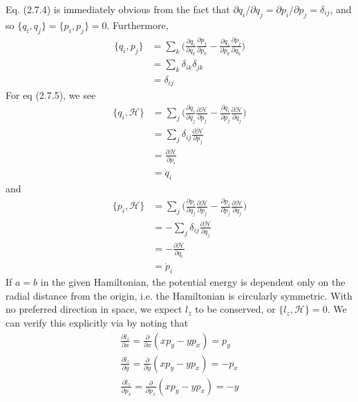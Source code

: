 \documentclass[../principles-of-quantum-mechanics.tex]{subfiles}
\begin{document}
\begin{questions}
		\begin{solution}
			Eq. (2.7.4) is immediately obvious from the fact that $\partial q_i/\partial q_j = \partial p_i/\partial p_j = \delta_{ij}$, and so $\{q_i, q_j\} = \{p_i, p_j\} = 0$. Furthermore,
			\begin{align*}
				\{q_i, p_j\} &= \sum_k\Big(\frac{\partial q_i}{\partial q_k}\frac{\partial p_j}{\partial p_k} - \frac{\partial q_i}{\partial p_k}\frac{\partial p_j}{\partial q_k}\Big) \\
				&= \sum_k\delta_{ik}\delta_{jk} \\
				&= \delta_{ij}
			\end{align*}
			For eq (2.7.5), we see
			\begin{align*}
				\{q_i, \mathcal{H}\} &= \sum_j\Big(\frac{\partial q_i}{\partial q_j}\frac{\partial \mathcal{H}}{\partial p_j} - \frac{\partial q_i}{\partial p_j}\frac{\partial \mathcal{H}}{\partial q_j}\Big) \\
				&= \sum_j\delta_{ij}\frac{\partial \mathcal{H}}{\partial p_j} \\
				&= \frac{\partial \mathcal{H}}{\partial p_i} \\
				&= \dot{q}_i
			\end{align*}
			and
			\begin{align*}
			\{p_i, \mathcal{H}\} &= \sum_j\Big(\frac{\partial p_i}{\partial q_j}\frac{\partial \mathcal{H}}{\partial p_j} - \frac{\partial p_i}{\partial p_j}\frac{\partial \mathcal{H}}{\partial q_j}\Big) \\
			&= -\sum_j\delta_{ij}\frac{\partial \mathcal{H}}{\partial q_j} \\
			&= -\frac{\partial \mathcal{H}}{\partial q_i} \\
			&= \dot{p}_i
			\end{align*}
			If $a = b$ in the given Hamiltonian, the potential energy is dependent only on the radial distance from the origin, i.e. the Hamiltonian is circularly symmetric. With no preferred direction in space, we expect $l_z$ to be conserved, or $\{l_z, \mathcal{H}\} = 0$. We can verify this explicitly via by noting that
			\begin{gather*}
				\frac{\partial l_z}{\partial x} = \frac{\partial}{\partial x}(xp_y - yp_x) = p_y \\
				\frac{\partial l_z}{\partial y} = \frac{\partial}{\partial y}(xp_y - yp_x) = {-p_x} \\
				\frac{\partial l_z}{\partial p_x} = \frac{\partial}{\partial p_x}(xp_y - yp_x) = {-y} \\

\end{gather*}
\end{solution}
\end{questions}
\end{document}
